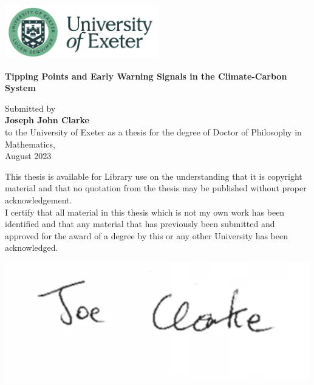 \graphicspath{{figs/}}
\begin{titlepage}
        \begin{center}
        \vspace{1cm}
        \includegraphics[width=0.5\textwidth]{Exeter_logo.png}
        \Huge
        
        \vspace*{1.5cm}
        \textbf{Tipping Points and Early Warning Signals in the Climate-Carbon System}
        \vspace{2cm}
        \large


        Submitted by\\
        \textbf{Joseph John Clarke}\\
        to the University of Exeter as a thesis for the degree of Doctor of Philosophy in Mathematics,\\
        August 2023

        \vspace{2cm}
        \normalsize
        This thesis is available for Library use on the understanding that it is copyright
	material and that no quotation from the thesis may be published without proper
	acknowledgement.\\
	\vspace{1cm}
	I certify that all material in this thesis which is not my own work has been identified
	and that any material that has previously been submitted and approved for the award
	of a degree by this or any other University has been acknowledged.
	
	
	\vspace{1cm}
          \includegraphics[scale=0.5]{signature.pdf}
        \end{center}
\end{titlepage}